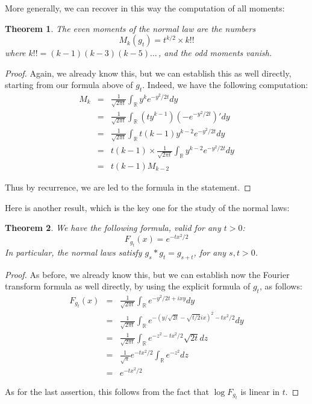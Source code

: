 \documentclass[12pt]{amsbook}
\newtheorem{theorem}{Theorem}[chapter]
\begin{document}
More generally, we can recover in this way the computation of all moments:

\begin{theorem}
The even moments of the normal law are the numbers
$$M_k(g_t)=t^{k/2}\times k!!$$
where $k!!=(k-1)(k-3)(k-5)\ldots\,$, and the odd moments vanish. 
\end{theorem}

\begin{proof}
Again, we already know this, but we can establish this as well directly, starting from our formula above of $g_t$. Indeed, we have the following computation:
\begin{eqnarray*}
M_k
&=&\frac{1}{\sqrt{2\pi t}}\int_\mathbb Ry^ke^{-y^2/2t}dy\\
&=&\frac{1}{\sqrt{2\pi t}}\int_\mathbb R(ty^{k-1})\left(-e^{-y^2/2t}\right)'dy\\
&=&\frac{1}{\sqrt{2\pi t}}\int_\mathbb Rt(k-1)y^{k-2}e^{-y^2/2t}dy\\
&=&t(k-1)\times\frac{1}{\sqrt{2\pi t}}\int_\mathbb Ry^{k-2}e^{-y^2/2t}dy\\
&=&t(k-1)M_{k-2}
\end{eqnarray*}

Thus by recurrence, we are led to the formula in the statement.
\end{proof}

Here is another result, which is the key one for the study of the normal laws:


\begin{theorem}
We have the following formula, valid for any $t>0$:
$$F_{g_t}(x)=e^{-tx^2/2}$$
In particular, the normal laws satisfy $g_s*g_t=g_{s+t}$, for any $s,t>0$.
\end{theorem}

\begin{proof}
As before, we already know this, but we can establish now the Fourier transform formula as well directly, by using the explicit formula of $g_t$, as follows:
\begin{eqnarray*}
F_{g_t}(x)
&=&\frac{1}{\sqrt{2\pi t}}\int_\mathbb Re^{-y^2/2t+ixy}dy\\
&=&\frac{1}{\sqrt{2\pi t}}\int_\mathbb Re^{-(y/\sqrt{2t}-\sqrt{t/2}ix)^2-tx^2/2}dy\\
&=&\frac{1}{\sqrt{2\pi t}}\int_\mathbb Re^{-z^2-tx^2/2}\sqrt{2t}dz\\
&=&\frac{1}{\sqrt{\pi}}e^{-tx^2/2}\int_\mathbb Re^{-z^2}dz\\
&=&e^{-tx^2/2}
\end{eqnarray*}

As for the last assertion, this follows from the fact that $\log F_{g_t}$ is linear in $t$.
\end{proof}
\end{document}
